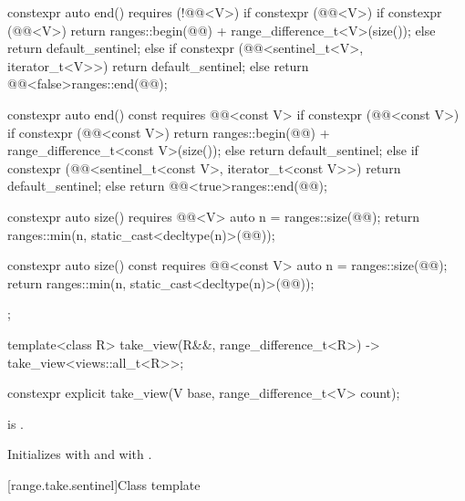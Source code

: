 \begin{codeblock}
{{    constexpr auto end() requires (!@@<V>) {
      if constexpr (@@<V>) {
        if constexpr (@@<V>)
          return ranges::begin(@@) + range_difference_t<V>(size());
        else
          return default_sentinel;
      } else if constexpr (@@<sentinel_t<V>, iterator_t<V>>) {
        return default_sentinel;
      } else {
        return @@<false>{ranges::end(@@)};
      }
    }

    constexpr auto end() const requires @@<const V> {
      if constexpr (@@<const V>) {
        if constexpr (@@<const V>)
          return ranges::begin(@@) + range_difference_t<const V>(size());
        else
          return default_sentinel;
      } else if constexpr (@@<sentinel_t<const V>, iterator_t<const V>>) {
        return default_sentinel;
      } else {
        return @@<true>{ranges::end(@@)};
      }
    }

    constexpr auto size() requires @@<V> {
      auto n = ranges::size(@@);
      return ranges::min(n, static_cast<decltype(n)>(@@));
    }

    constexpr auto size() const requires @@<const V> {
      auto n = ranges::size(@@);
      return ranges::min(n, static_cast<decltype(n)>(@@));
    }
  };

  template<class R>
    take_view(R&&, range_difference_t<R>)
      -> take_view<views::all_t<R>>;
}
\end{codeblock}

%
\begin{itemdecl}
constexpr explicit take_view(V base, range_difference_t<V> count);
\end{itemdecl}

\begin{itemdescr}
\pnum
\expects
{} is .

\pnum
\effects
Initializes  with  and
 with .
\end{itemdescr}

[range.take.sentinel]{Class template }

